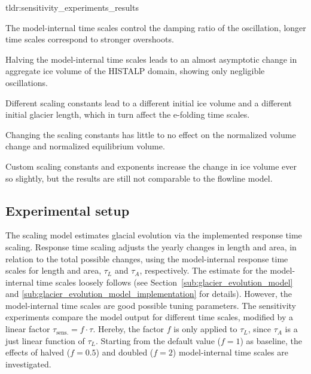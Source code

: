     \begin{tldrbox}{tldr:sensitivity_experiments_results}
      \item The model-internal time scales control the damping ratio of the oscillation, longer time scales correspond to stronger overshoots.
      \item Halving the model-internal time scales leads to an almost asymptotic change in aggregate ice volume of the HISTALP domain, showing only negligible oscillations.
      \item Different scaling constants lead to a different initial ice volume and a different initial glacier length, which in turn affect the e-folding time scales.
      \item Changing the scaling constants has little to no effect on the normalized volume change and normalized equilibrium volume.
      \item Custom scaling constants and exponents increase the change in ice volume ever so slightly, but the results are still not comparable to the flowline model.
    \end{tldrbox}

    \subsection{Experimental setup} %
    \label{sub:experimental_setup_sensitivity}

        The scaling model estimates glacial evolution via the implemented response time scaling. Response time scaling adjusts the yearly changes in length and area, in relation to the total possible changes, using the model-internal response time scales for length and area, $\tau_L$ and  $\tau_A$, respectively.
        The estimate for the model-internal time scales loosely follows \citet{Johannesson1989} (see Section~\ref{sub:glacier_evolution_model} and \ref{sub:glacier_evolution_model_implementation} for details). However, the model-internal time scales are good possible tuning parameters. The sensitivity experiments compare the model output for different time scales, modified by a linear factor $\tau_\text{sens.} = f \cdot \tau$. Hereby, the factor $f$ is only applied to $\tau_L$, since $\tau_A$ is a just linear function of $\tau_L$. Starting from the default value ($f=1$) as baseline, the effects of halved ($f=0.5$) and doubled ($f=2$) model-internal time scales are investigated.

